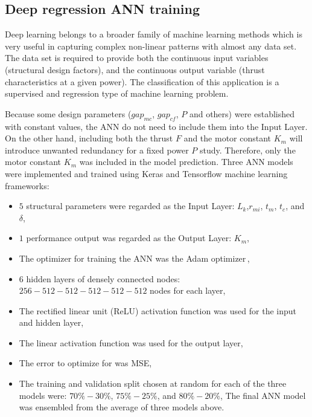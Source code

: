         
        \subsection{Deep regression ANN training}   \label{Chapter:RSM/PMLSM/ANN training}
        
            
            Deep learning belongs to a broader family of machine learning methods which is very useful in capturing complex non-linear patterns with almost any data set. The data set is required to provide both the continuous input variables (structural design factors), and the continuous output variable (thrust characteristics at a given power). The classification of this application is a supervised and regression type of machine learning problem.
            
            
            Because some design parameters ($gap_{mc}$, $gap_{cf}$, $P$ and others) were established with constant values, the \acs{ANN} do not need to include them into the Input Layer. On the other hand, including both the thrust $F$ and the motor constant $K_m$ will introduce unwanted redundancy for a fixed power $P$ study. Therefore, only the motor constant $K_m$ was included in the model prediction. Three \acs{ANN} models were implemented and trained using Keras and Tensorflow machine learning frameworks:
            
            
            \begin{itemize}
                \item $5$ structural parameters were regarded as the Input Layer: $L_k$,$r_{mi}$, $t_m$, $t_c$, and $\delta$,
                \item $1$ performance output was regarded as the Output Layer: $K_m$,
                \item The optimizer for training the \acs{ANN} was the Adam optimizer\,\cite{Kingma2014},
                \item $6$ hidden layers of densely connected nodes: $256-512-512-512-512-512$ nodes for each layer,
                \item The rectified linear unit (ReLU) activation function was used
for the input and hidden layer,
                \item The linear activation function was used for the output layer,
                \item The error to optimize for was \acf{MSE},
                \item The training and validation split chosen at random for each of the three models were: $70\%-30\%$, $75\%-25\%$, and $80\%-20\%$,
                The final \acs{ANN} model was ensembled from the average of three models above.
            \end{itemize}
            
